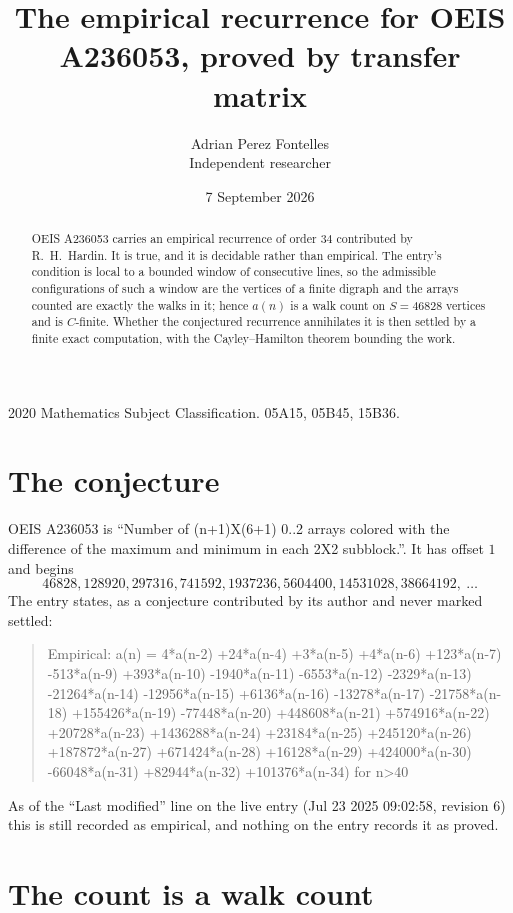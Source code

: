 \documentclass[11pt,a4paper]{article}
\title{The empirical recurrence for OEIS A236053, proved by transfer matrix}
\author{Adrian Perez Fontelles\\ \small Independent researcher}
\date{7 September 2026}
\theoremstyle{plain}
\theoremstyle{definition}
\begin{document}
\maketitle

\begin{abstract}
OEIS A236053 carries an empirical recurrence of order $34$ contributed by R.~H.~Hardin. It is
true, and it is decidable rather than empirical. The entry's condition is local to a bounded window of consecutive lines, so
the admissible configurations of such a window are the vertices of a finite digraph and the
arrays counted are exactly the walks in it; hence $a(n)$ is a walk count on $S=46828$ vertices
and is $C$-finite. Whether the conjectured recurrence annihilates it is then settled by a
finite exact computation, with the Cayley--Hamilton theorem bounding the work.
\end{abstract}

\noindent\small 2020 Mathematics Subject Classification. 05A15, 05B45, 15B36.\normalsize

\section{The conjecture}

OEIS A236053 is ``Number of (n+1)X(6+1) 0..2 arrays colored with the difference of the maximum and minimum in each 2X2 subblock.''. It has offset $1$ and begins
\[
46828, 128920, 297316, 741592, 1937236, 5604400, 14531028, 38664192,\ \dots
\]
The entry states, as a conjecture contributed by its author and never marked settled:
\begin{quote}
Empirical: a(n) = 4*a(n-2) +24*a(n-4) +3*a(n-5) +4*a(n-6) +123*a(n-7) -513*a(n-9) +393*a(n-10) -1940*a(n-11) -6553*a(n-12) -2329*a(n-13) -21264*a(n-14) -12956*a(n-15) +6136*a(n-16) -13278*a(n-17) -21758*a(n-18) +155426*a(n-19) -77448*a(n-20) +448608*a(n-21) +574916*a(n-22) +20728*a(n-23) +1436288*a(n-24) +23184*a(n-25) +245120*a(n-26) +187872*a(n-27) +671424*a(n-28) +16128*a(n-29) +424000*a(n-30) -66048*a(n-31) +82944*a(n-32) +101376*a(n-34) for n>40
\end{quote}
As of the ``Last modified'' line on the live entry (Jul 23 2025 09:02:58, revision 6) this is still
recorded as empirical, and nothing on the entry records it as proved.

\section{The count is a walk count}
\end{document}
